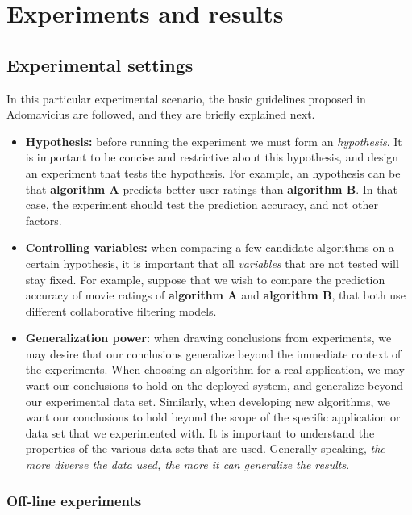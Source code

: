 \chapter{Experiments and results} \label{results}

\section{Experimental settings} 

In this particular experimental scenario, the basic guidelines 
proposed in Adomavicius \cite{adomavicius2011context} are followed,  
and they are briefly explained next. 
\begin{itemize} 
\item \textbf{Hypothesis:} before running the experiment we must form
an \textit{hypothesis}. It is important to be concise and restrictive
about this hypothesis, and design an experiment that tests the
hypothesis. For example, an hypothesis can be that  \textbf{algorithm
A} predicts better user ratings than  \textbf{algorithm B}.  In that
case, the experiment should test the prediction accuracy, and not
other factors.
\item \textbf{Controlling variables:} when comparing a few candidate
algorithms on a certain hypothesis, it is important that all
\textit{variables} that are not tested will stay fixed. For example,
suppose that we wish to compare the prediction accuracy of movie
ratings of  \textbf{algorithm A} and \textbf{algorithm B}, that both
use different collaborative filtering models.
\item \textbf{Generalization power:} when drawing conclusions from
experiments, we may desire that our conclusions generalize beyond the
immediate context of the experiments. When choosing an algorithm for a
real application, we may want our conclusions to hold on the deployed
system, and generalize beyond our experimental data set. Similarly,
when developing new algorithms, we want our conclusions to hold beyond
the scope of the specific application or data set that we experimented
with. It is important to understand the properties of the various data
sets that are used. Generally speaking, \textit{the more diverse the
data used, the more it can generalize the results}.
\end{itemize} 

\subsection{Off-line experiments} 

